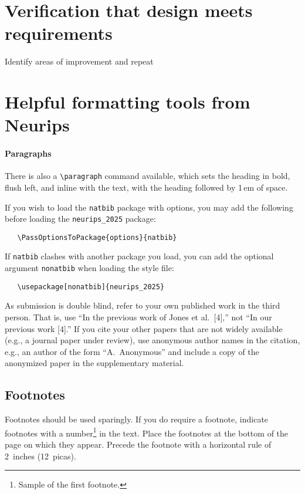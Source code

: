 \documentclass{article}
\begin{document}
\section{Verification that design meets requirements}

Identify areas of improvement and repeat

\section{Helpful formatting tools from Neurips}

\paragraph{Paragraphs}

There is also a \verb+\paragraph+ command available, which sets the heading in
bold, flush left, and inline with the text, with the heading followed by 1\,em
of space.

If you wish to load the \verb+natbib+ package with options, you may add the
following before loading the \verb+neurips_2025+ package:
\begin{verbatim}
   \PassOptionsToPackage{options}{natbib}
\end{verbatim}

If \verb+natbib+ clashes with another package you load, you can add the optional
argument \verb+nonatbib+ when loading the style file:
\begin{verbatim}
   \usepackage[nonatbib]{neurips_2025}
\end{verbatim}

As submission is double blind, refer to your own published work in the third
person. That is, use ``In the previous work of Jones et al.\ [4],'' not ``In our
previous work [4].'' If you cite your other papers that are not widely available
(e.g., a journal paper under review), use anonymous author names in the
citation, e.g., an author of the form ``A.\ Anonymous'' and include a copy of the anonymized paper in the supplementary material.

\subsection{Footnotes}

Footnotes should be used sparingly.  If you do require a footnote, indicate
footnotes with a number\footnote{Sample of the first footnote.} in the
text. Place the footnotes at the bottom of the page on which they appear.
Precede the footnote with a horizontal rule of 2~inches (12~picas).
\end{document}
